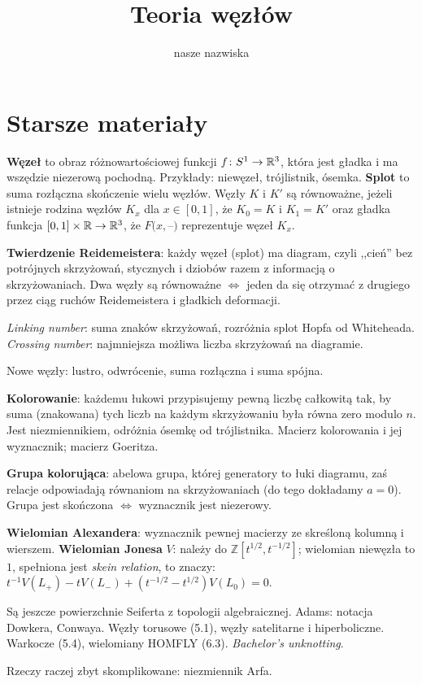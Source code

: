 \documentclass[a4paper, fleqn]{extarticle}
\title{Teoria węzłów}
\author{nasze nazwiska}
\numberwithin{dummy}{section}
\begin{document}
\maketitle
\tableofcontents






\newpage

\raggedright

\section*{Starsze materiały}

\textbf{Węzeł} to obraz różnowartościowej funkcji $f \colon S^1 \to \mathbb R^3$, która jest gładka i ma wszędzie niezerową pochodną. Przykłady: niewęzeł, trójlistnik, ósemka.
\textbf{Splot} to suma rozłączna skończenie wielu węzłów.
Węzły $K$ i $K'$ są równoważne, jeżeli istnieje rodzina węzłów $K_x$ dla $x \in [0,1]$, że $K_0 = K$ i $K_1 = K'$ oraz gładka funkcja $[0,1] \times \mathbb R \to \mathbb R^3$, że $F(x,$--$)$ reprezentuje węzeł $K_x$.

\textbf{Twierdzenie Reidemeistera}: każdy węzeł (splot) ma diagram, czyli ,,cień'' bez potrójnych skrzyżowań, stycznych i dziobów razem z informacją o skrzyżowaniach.
Dwa węzły są równoważne $\iff$ jeden da się otrzymać z drugiego przez ciąg ruchów Reidemeistera i gładkich deformacji.

\emph{Linking number}: suma znaków skrzyżowań, rozróżnia splot Hopfa od Whiteheada.
\emph{Crossing number}: najmniejsza możliwa liczba skrzyżowań na diagramie.

Nowe węzły: lustro, odwrócenie, suma rozłączna i suma spójna.

\textbf{Kolorowanie}: każdemu łukowi przypisujemy pewną liczbę całkowitą tak, by suma (znakowana) tych liczb na każdym skrzyżowaniu była równa zero modulo $n$.
Jest niezmiennikiem, odróżnia ósemkę od trójlistnika.
Macierz kolorowania i jej wyznacznik; macierz Goeritza.

\textbf{Grupa kolorująca}: abelowa grupa, której generatory to łuki diagramu, zaś relacje odpowiadają równaniom na skrzyżowaniach (do tego dokładamy $a = 0$).
Grupa jest skończona $\iff$ wyznacznik jest niezerowy.

\textbf{Wielomian Alexandera}: wyznacznik pewnej macierzy ze skreśloną kolumną i wierszem.
\textbf{Wielomian Jonesa} $V$: należy do $\mathbb Z[t^{1/2}, t^{-1/2}]$; wielomian niewęzła to $1$, spełniona jest \emph{skein relation}, to znaczy: $t^{-1}V(L_+)-tV(L_-)+(t^{-1/2}-t^{1/2})V(L_0)=0$.

Są jeszcze powierzchnie Seiferta z topologii algebraicznej.
Adams: notacja Dowkera, Conwaya. Węzły torusowe (5.1), węzły satelitarne i hiperboliczne.
Warkocze (5.4), wielomiany HOMFLY (6.3).
\emph{Bachelor's unknotting}.

Rzeczy raczej zbyt skomplikowane: niezmiennik Arfa.
\end{document}
